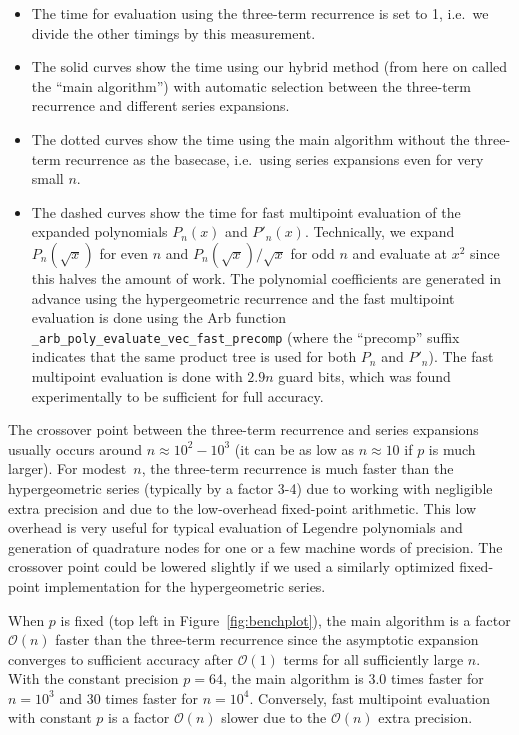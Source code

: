 \documentclass{siamart0216}
\newcommand{\OO}{\mathcal{O}}
\begin{document}
\begin{itemize}
\item The time for evaluation using the three-term recurrence is set to 1, i.e.\ we divide
the other timings by this measurement.
\item The solid curves show the time using our hybrid method
(from here on called the ``main algorithm'')
with automatic selection between the three-term
recurrence and different
series expansions.
\item The dotted curves show the time using the main algorithm without
the three-term recurrence as the basecase, i.e.\ using series expansions
even for very small $n$.
\item The dashed curves show the time for fast multipoint
evaluation of the expanded polynomials $P_n(x)$ and $P'_n(x)$.
Technically, we expand
$P_{n}(\sqrt{x})$ for even $n$ and $P_{n}(\sqrt{x})/\sqrt{x}$ for odd $n$
and evaluate at $x^2$ since this halves the amount of work.
The polynomial coefficients are generated in advance using
the hypergeometric recurrence and
the fast multipoint evaluation is done using
the Arb function \texttt{\_arb\_poly\_evaluate\_vec\_fast\_precomp}
(where the ``precomp'' suffix indicates that
the same product tree is used for both $P_n$ and $P'_n$).
The fast multipoint evaluation is done with $2.9n$ guard bits,
which was found experimentally to be sufficient for full accuracy.
\end{itemize}

The crossover point between the
three-term recurrence and series expansions usually occurs
around $n \approx 10^2 - 10^3$ (it can be as low as $n \approx 10$
if $p$ is much larger).
For modest $n$,
the three-term recurrence is much faster
than the hypergeometric series (typically by a factor 3-4)
due to working with negligible extra precision
and due to the low-overhead fixed-point arithmetic.
This low overhead is very useful for typical evaluation of
Legendre polynomials and generation of quadrature nodes
for one or a few machine words of precision.
The crossover point could be lowered slightly
if we used a similarly optimized fixed-point implementation
for the hypergeometric series.

When $p$ is fixed (top left in Figure~\ref{fig:benchplot}), the main algorithm is
a factor $\OO(n)$ faster
than the three-term recurrence
since the asymptotic expansion converges to sufficient accuracy after
$\OO(1)$ terms for all sufficiently large $n$.
With the constant precision $p = 64$,
the main algorithm is 3.0
times faster for $n = 10^3$ and 30 times faster for $n = 10^4$.
Conversely, fast multipoint evaluation
with constant $p$ is a factor $\OO(n)$ slower due to the $\OO(n)$ extra precision.
\end{document}
